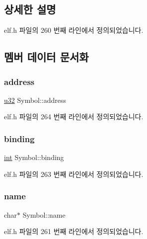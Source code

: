 \subsection{상세한 설명}


elf.\+h 파일의 260 번째 라인에서 정의되었습니다.



\subsection{멤버 데이터 문서화}
\mbox{\label{struct_symbol_a410b524fa23be6c41b1de68c9b620226}} 
\subsubsection{\texorpdfstring{address}{address}}
{\footnotesize\ttfamily \mbox{\hyperlink{_system_8h_a10e94b422ef0c20dcdec20d31a1f5049}{u32}} Symbol\+::address}



elf.\+h 파일의 264 번째 라인에서 정의되었습니다.

\mbox{\label{struct_symbol_a7b846956436c2911e3b316bf06b080fd}} 
\subsubsection{\texorpdfstring{binding}{binding}}
{\footnotesize\ttfamily \mbox{\hyperlink{_util_8cpp_a0ef32aa8672df19503a49fab2d0c8071}{int}} Symbol\+::binding}



elf.\+h 파일의 263 번째 라인에서 정의되었습니다.

\mbox{\label{struct_symbol_aa9ba617cd9de17ed73148893a6c14606}} 
\subsubsection{\texorpdfstring{name}{name}}
{\footnotesize\ttfamily char$\ast$ Symbol\+::name}



elf.\+h 파일의 261 번째 라인에서 정의되었습니다.

\mbox{\label{struct_symbol_a1ce0cce2939edefe73195657c6371f56}} 
